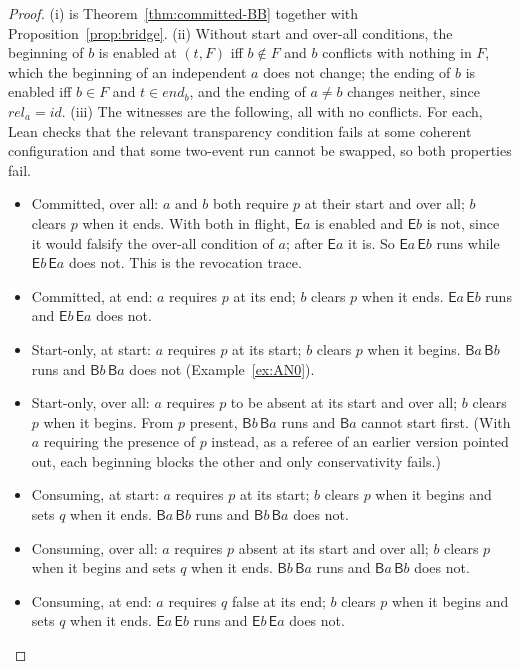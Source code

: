 \documentclass[preprint,12pt]{elsarticle}
\theoremstyle{plain}
\theoremstyle{definition}
\newcommand{\stp}{\mathit{end}}
\newcommand{\rel}{\mathit{rel}}
\newcommand{\id}{\mathit{id}}
\newcommand{\B}[1]{\mathsf{B}#1}
\newcommand{\E}[1]{\mathsf{E}#1}
\begin{document}
\begin{proof}
(i) is Theorem~\ref{thm:committed-BB} together with Proposition~\ref{prop:bridge}. (ii) Without start and over-all conditions, the beginning of $b$ is enabled at $(t, F)$ iff $b \notin F$ and $b$ conflicts with nothing in $F$, which the beginning of an independent $a$ does not change; the ending of $b$ is enabled iff $b \in F$ and $t \in \stp_b$, and the ending of $a \neq b$ changes neither, since $\rel_a = \id$. (iii) The witnesses are the following, all with no conflicts. For each, Lean checks that the relevant transparency condition fails at some coherent configuration and that some two-event run cannot be swapped, so both properties fail.
\begin{itemize}
\item Committed, over all: $a$ and $b$ both require $p$ at their start and over all; $b$ clears $p$ when it ends. With both in flight, $\E{a}$ is enabled and $\E{b}$ is not, since it would falsify the over-all condition of $a$; after $\E{a}$ it is. So $\E{a}\,\E{b}$ runs while $\E{b}\,\E{a}$ does not. This is the revocation trace.
\item Committed, at end: $a$ requires $p$ at its end; $b$ clears $p$ when it ends. $\E{a}\,\E{b}$ runs and $\E{b}\,\E{a}$ does not.
\item Start-only, at start: $a$ requires $p$ at its start; $b$ clears $p$ when it begins. $\B{a}\,\B{b}$ runs and $\B{b}\,\B{a}$ does not (Example~\ref{ex:AN0}).
\item Start-only, over all: $a$ requires $p$ to be absent at its start and over all; $b$ clears $p$ when it begins. From $p$ present, $\B{b}\,\B{a}$ runs and $\B{a}$ cannot start first. (With $a$ requiring the presence of $p$ instead, as a referee of an earlier version pointed out, each beginning blocks the other and only conservativity fails.)
\item Consuming, at start: $a$ requires $p$ at its start; $b$ clears $p$ when it begins and sets $q$ when it ends. $\B{a}\,\B{b}$ runs and $\B{b}\,\B{a}$ does not.
\item Consuming, over all: $a$ requires $p$ absent at its start and over all; $b$ clears $p$ when it begins and sets $q$ when it ends. $\B{b}\,\B{a}$ runs and $\B{a}\,\B{b}$ does not.
\item Consuming, at end: $a$ requires $q$ false at its end; $b$ clears $p$ when it begins and sets $q$ when it ends. $\E{a}\,\E{b}$ runs and $\E{b}\,\E{a}$ does not.
\end{itemize}
\end{proof}
\end{document}
